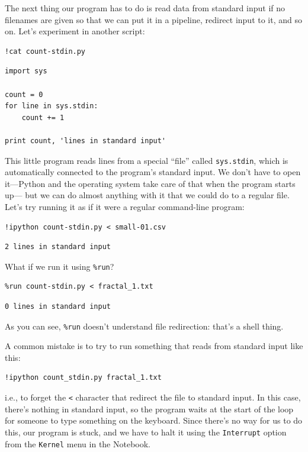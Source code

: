 \documentclass[]{book}
\begin{document}
The next thing our program has to do is read data from standard input if
no filenames are given so that we can put it in a pipeline, redirect
input to it, and so on. Let's experiment in another script:

\begin{verbatim}
!cat count-stdin.py
\end{verbatim}

\begin{verbatim}
import sys

count = 0
for line in sys.stdin:
    count += 1

print count, 'lines in standard input'
\end{verbatim}

This little program reads lines from a special ``file'' called
\texttt{sys.stdin}, which is automatically connected to the program's
standard input. We don't have to open it---Python and the operating
system take care of that when the program starts up--- but we can do
almost anything with it that we could do to a regular file. Let's try
running it as if it were a regular command-line program:

\begin{verbatim}
!ipython count-stdin.py < small-01.csv
\end{verbatim}

\begin{verbatim}
2 lines in standard input
\end{verbatim}

What if we run it using \texttt{\%run}?

\begin{verbatim}
%run count-stdin.py < fractal_1.txt
\end{verbatim}

\begin{verbatim}
0 lines in standard input
\end{verbatim}

As you can see, \texttt{\%run} doesn't understand file redirection:
that's a shell thing.

A common mistake is to try to run something that reads from standard
input like this:

\begin{verbatim}
!ipython count_stdin.py fractal_1.txt
\end{verbatim}

i.e., to forget the \texttt{\textless{}} character that redirect the
file to standard input. In this case, there's nothing in standard input,
so the program waits at the start of the loop for someone to type
something on the keyboard. Since there's no way for us to do this, our
program is stuck, and we have to halt it using the \texttt{Interrupt}
option from the \texttt{Kernel} menu in the Notebook.
\end{document}
